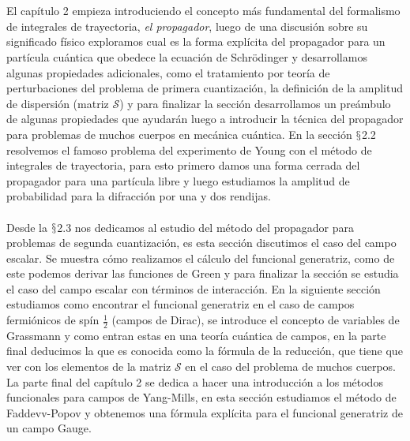 \\
\\
El capítulo 2 empieza introduciendo el concepto más fundamental del formalismo de integrales de trayectoria, \textit{el propagador}, luego de una discusión sobre su significado físico exploramos cual es la forma explícita del propagador para un partícula cuántica que obedece la ecuación de Schrödinger y desarrollamos algunas propiedades adicionales, como el tratamiento por teoría de perturbaciones del problema de primera cuantización, la definición de la amplitud de dispersión (matriz $\mathcal{S}$) y para finalizar la sección desarrollamos un preámbulo de algunas propiedades que ayudarán luego a introducir la técnica del propagador para problemas de muchos cuerpos en mecánica cuántica. En la sección  $\mathsection$2.2 resolvemos el famoso problema del experimento de Young con el método de integrales de trayectoria, para esto primero damos una forma cerrada del propagador para una partícula libre y luego estudiamos la amplitud de probabilidad para la difracción por una y dos rendijas.
\\
\\
Desde la  $\mathsection$2.3 nos dedicamos al estudio del método del propagador para problemas de segunda cuantización, es esta sección discutimos el caso del campo escalar. Se muestra cómo realizamos el cálculo del funcional generatriz, como de este podemos derivar las funciones de Green y para finalizar la sección se estudia el caso del campo escalar con términos de interacción. En la siguiente sección estudiamos como encontrar el funcional generatriz en el caso de campos fermiónicos de spín $\frac{1}{2}$ (campos de Dirac), se introduce el concepto de variables de Grassmann y como entran estas en una teoría cuántica de campos, en la parte final deducimos la que es conocida como la fórmula de la reducción, que tiene que ver con los elementos de la matriz $\mathcal{S}$ en el caso del problema de muchos cuerpos. La parte final del capítulo 2 se dedica a hacer una introducción a los métodos funcionales para campos de Yang-Mills, en esta sección estudiamos el método de Faddevv-Popov y obtenemos una fórmula explícita para el funcional generatriz de un campo Gauge.
\\
\\
